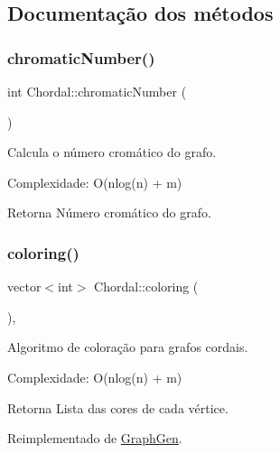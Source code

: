 \subsection{Documentação dos métodos}
\mbox{\label{classChordal_ad7e9a3c8bd7f66ad4ddc6221523e6b12}} 
\subsubsection{\texorpdfstring{chromatic\+Number()}{chromaticNumber()}}
{\footnotesize\ttfamily int Chordal\+::chromatic\+Number (\begin{DoxyParamCaption}{ }\end{DoxyParamCaption})}

Calcula o número cromático do grafo.

Complexidade\+: O(nlog(n) + m) \begin{DoxyReturn}{Retorna}
Número cromático do grafo. 
\end{DoxyReturn}
\mbox{\label{classChordal_acac4822a1eb3376c29f3d193baaec91f}} 
\subsubsection{\texorpdfstring{coloring()}{coloring()}}
{\footnotesize\ttfamily vector$<$int$>$ Chordal\+::coloring (\begin{DoxyParamCaption}{ }\end{DoxyParamCaption})\hspace{0.3cm}{\ttfamily [override]}, {\ttfamily [virtual]}}

Algoritmo de coloração para grafos cordais.

Complexidade\+: O(nlog(n) + m) \begin{DoxyReturn}{Retorna}
Lista das cores de cada vértice. 
\end{DoxyReturn}


Reimplementado de \hyperlink{classGraphGen_ad44c80646f694460fafa3e3657beb4d0}{Graph\+Gen}.

\mbox{\label{classChordal_aa19bddaef6b83d8bdb98993cf04929b7}} 

